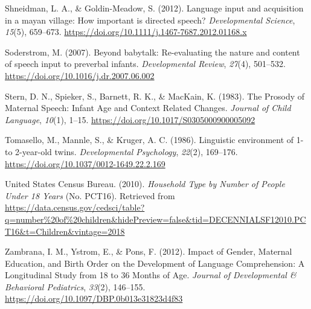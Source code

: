 \documentclass[
  english,
  man,floatsintext]{apa6}
\newlength{\cslhangindent}
\newlength{\cslentryspacingunit} %
\newenvironment{CSLReferences}[2] %
 {%
  \setlength{\parindent}{0pt}
  \ifodd #1
  \let\oldpar\par
  \def\par{\hangindent=\cslhangindent\oldpar}
  \fi
  \setlength{\parskip}{#2\cslentryspacingunit}
 }%
 {}
\begin{document}
\begin{CSLReferences}{1}{0}
\leavevmode{}%
Shneidman, L. A., \& Goldin-Meadow, S. (2012). Language input and acquisition in a mayan village: How important is directed speech? \emph{Developmental Science}, \emph{15}(5), 659--673. \url{https://doi.org/10.1111/j.1467-7687.2012.01168.x}

\leavevmode{}%
Soderstrom, M. (2007). Beyond babytalk: {Re}-evaluating the nature and content of speech input to preverbal infants. \emph{Developmental Review}, \emph{27}(4), 501--532. \url{https://doi.org/10.1016/j.dr.2007.06.002}

\leavevmode{}%
Stern, D. N., Spieker, S., Barnett, R. K., \& MacKain, K. (1983). The {Prosody} of {Maternal} {Speech}: {Infant} {Age} and {Context} {Related} {Changes}. \emph{Journal of Child Language}, \emph{10}(1), 1--15. \url{https://doi.org/10.1017/S0305000900005092}

\leavevmode{}%
Tomasello, M., Mannle, S., \& Kruger, A. C. (1986). Linguistic environment of 1- to 2-year-old twins. \emph{Developmental Psychology}, \emph{22}(2), 169--176. \url{https://doi.org/10.1037/0012-1649.22.2.169}

\leavevmode{}%
United States Census Bureau. (2010). \emph{Household {Type} by {Number} of {People} {Under} 18 {Years}} (No. PCT16). Retrieved from \url{https://data.census.gov/cedsci/table?q=number\%20of\%20children\&hidePreview=false\&tid=DECENNIALSF12010.PCT16\&t=Children\&vintage=2018}

\leavevmode{}%
Zambrana, I. M., Ystrom, E., \& Pons, F. (2012). Impact of {Gender}, {Maternal} {Education}, and {Birth} {Order} on the {Development} of {Language} {Comprehension}: {A} {Longitudinal} {Study} from 18 to 36 {Months} of {Age}. \emph{Journal of Developmental \& Behavioral Pediatrics}, \emph{33}(2), 146--155. \url{https://doi.org/10.1097/DBP.0b013e31823d4f83}

\end{CSLReferences}

\endgroup
\end{document}

